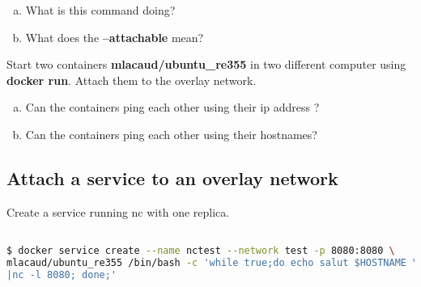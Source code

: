 \documentclass[a4paper,11pt]{exam}
\begin{document}
\begin{questions}
	\question 
	\begin{enumerate}[(a)]
		\item What is this command doing?
		\item What does the \textbf{--attachable} mean?
	\end{enumerate}


Start two containers \textbf{mlacaud/ubuntu\_re355} in two different computer using \textbf{docker run}. Attach them to the overlay network.


	\question 
	\begin{enumerate}[(a)]
		\item Can the containers ping each other using their ip address ?
		\item Can the containers ping each other using their hostnames?
	\end{enumerate}
\end{questions}

\subsection{Attach a service to an overlay network}

Create a service running nc with one replica.

\begin{lstlisting}[frame=single,language={sh}]  % Start your code-block

$ docker service create --name nctest --network test -p 8080:8080 \
mlacaud/ubuntu_re355 /bin/bash -c 'while true;do echo salut $HOSTNAME \
|nc -l 8080; done;'
\end{lstlisting}
\end{document}
